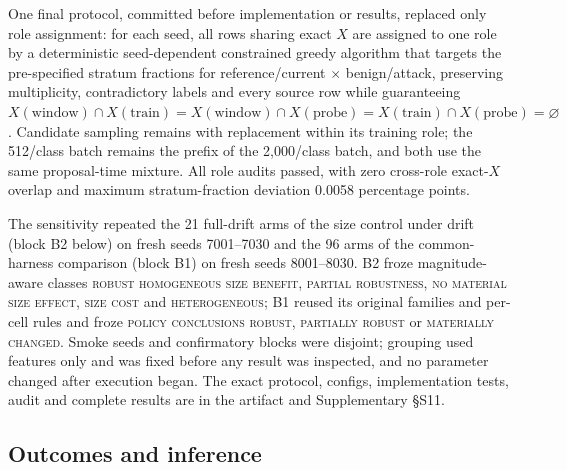 \documentclass[a4paper,fleqn]{cas-sc}
\begin{document}
One final protocol, committed before implementation or results, replaced only role assignment: for each seed, all rows sharing exact $X$ are assigned to one role by a deterministic seed-dependent constrained greedy algorithm that targets the pre-specified stratum fractions for reference/current $\times$ benign/attack, preserving multiplicity, contradictory labels and every source row while guaranteeing $X(\mathrm{window})\cap X(\mathrm{train})=X(\mathrm{window})\cap X(\mathrm{probe})=X(\mathrm{train})\cap X(\mathrm{probe})=\varnothing$. Candidate sampling remains with replacement within its training role; the 512/class batch remains the prefix of the 2{,}000/class batch, and both use the same proposal-time mixture. All role audits passed, with zero cross-role exact-$X$ overlap and maximum stratum-fraction deviation 0.0058 percentage points.

The sensitivity repeated the 21 full-drift arms of the size control under drift (block B2 below) on fresh seeds 7001--7030 and the 96 arms of the common-harness comparison (block B1) on fresh seeds 8001--8030. B2 froze magnitude-aware classes \textsc{robust homogeneous size benefit}, \textsc{partial robustness}, \textsc{no material size effect}, \textsc{size cost} and \textsc{heterogeneous}; B1 reused its original families and per-cell rules and froze \textsc{policy conclusions robust}, \textsc{partially robust} or \textsc{materially changed}. Smoke seeds and confirmatory blocks were disjoint; grouping used features only and was fixed before any result was inspected, and no parameter changed after execution began. The exact protocol, configs, implementation tests, audit and complete results are in the artifact and Supplementary \S S11.

\subsection{Outcomes and inference}
\label{sec:outcomes}
\end{document}
